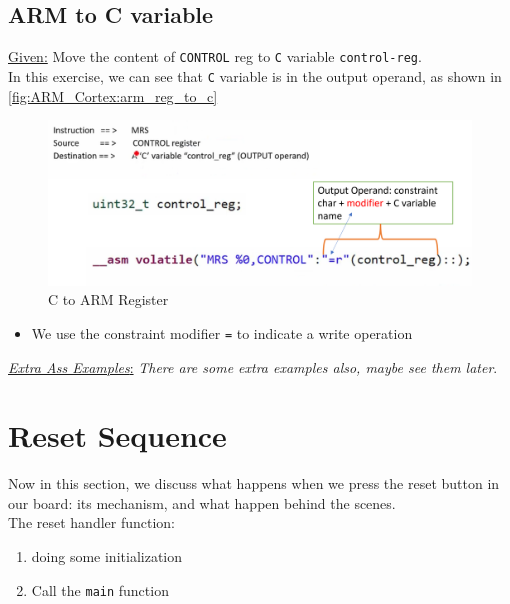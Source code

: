 \subsection{ARM to C variable}

\underline{Given:} Move the content of \verb|CONTROL| reg to \verb|C| variable \verb|control-reg|.\\

In this exercise, we can see that \verb|C| variable is in the output operand, as shown in \autoref{fig:ARM_Cortex:arm_reg_to_c}

\begin{figure}[h]
\centering
\includegraphics[scale=0.55]{Figures/ARM_Cortex/arm_reg_to_c}
\caption{C to ARM Register}
\label{fig:ARM_Cortex:arm_reg_to_c}
\end{figure}

\begin{itemize}
    \item We use the constraint modifier \verb|=| to indicate a write operation
\end{itemize}

 \underline{\textit{Extra Ass Examples}:} \textit{There are some extra examples also, maybe see them later}.

\newpage

\section{Reset Sequence}

Now in this section, we discuss what happens when we press the reset button in our board: its mechanism, and what happen behind the scenes.\\

The reset handler function:

\begin{enumerate}
    \item doing some initialization


    \item Call the \verb|main| function
\end{enumerate}


